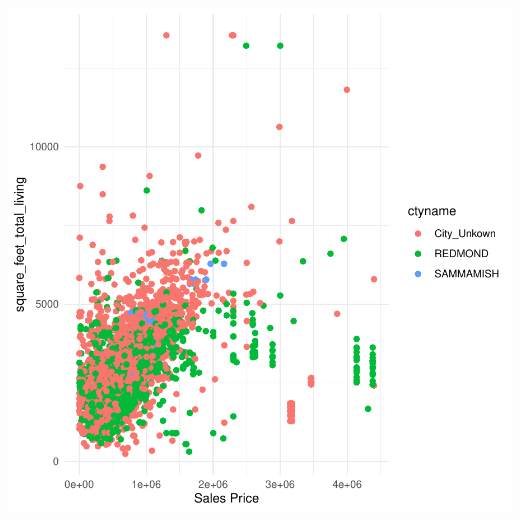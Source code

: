 \documentclass{article}\usepackage[]{graphicx}\usepackage[]{xcolor}
\newenvironment{knitrout}{}{} %
\begin{document}
\begin{knitrout}
{\centering \includegraphics[width=.6\linewidth]{figure/assignment-04-02-Couto-Maria-Rnwauto-report-2} 

}



\end{knitrout}
\end{document}
